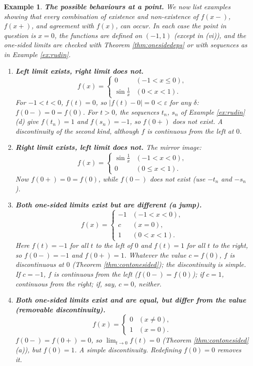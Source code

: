 \documentclass{article}
\theoremstyle{mythm}
\newtheorem{example}[theorem]{Example}
\begin{document}
\begin{example}\label{ex:possibilities}
\textbf{The possible behaviours at a point.} We now list examples showing that every combination of existence and non-existence of $f(x-)$, $f(x+)$, and agreement with $f(x)$, can occur. In each case the point in question is $x = 0$, the functions are defined on $(-1,1)$ (except in (vi)), and the one-sided limits are checked with Theorem \ref{thm:onesidedeps} or with sequences as in Example \ref{ex:rudin}.
\begin{enumerate}[label=(\roman*)]
    \item \textbf{Left limit exists, right limit does not.}
    \[
    f(x) = \begin{cases} 0 & (-1 < x \leq 0), \\ \sin \frac{1}{x} & (0 < x < 1). \end{cases}
    \]
    For $-1 < t < 0$, $f(t) = 0$, so $|f(t) - 0| = 0 < \varepsilon$ for any $\delta$: $f(0-) = 0 = f(0)$. For $t > 0$, the sequences $t_n$, $s_n$ of Example \ref{ex:rudin}(d) give $f(t_n) = 1$ and $f(s_n) = -1$, so $f(0+)$ does not exist. A discontinuity of the second kind, although $f$ is continuous from the left at $0$.

    \item \textbf{Right limit exists, left limit does not.} The mirror image:
    \[
    f(x) = \begin{cases} \sin \frac{1}{x} & (-1 < x < 0), \\ 0 & (0 \leq x < 1). \end{cases}
    \]
    Now $f(0+) = 0 = f(0)$, while $f(0-)$ does not exist (use $-t_n$ and $-s_n$).

    \item \textbf{Both one-sided limits exist but are different (a jump).}
    \[
    f(x) = \begin{cases} -1 & (-1 < x < 0), \\ c & (x = 0), \\ 1 & (0 < x < 1). \end{cases}
    \]
    Here $f(t) = -1$ for all $t$ to the left of $0$ and $f(t) = 1$ for all $t$ to the right, so $f(0-) = -1$ and $f(0+) = 1$. Whatever the value $c = f(0)$, $f$ is discontinuous at $0$ (Theorem \ref{thm:contonesided}); the discontinuity is simple. If $c = -1$, $f$ is continuous from the left ($f(0-) = f(0)$); if $c = 1$, continuous from the right; if, say, $c = 0$, neither.

    \item \textbf{Both one-sided limits exist and are equal, but differ from the value (removable discontinuity).}
    \[
    f(x) = \begin{cases} 0 & (x \neq 0), \\ 1 & (x = 0). \end{cases}
    \]
    $f(0-) = f(0+) = 0$, so $\lim_{t\to 0} f(t) = 0$ (Theorem \ref{thm:contonesided}(a)), but $f(0) = 1$. A simple discontinuity. Redefining $f(0) = 0$ removes it.


\end{enumerate}
\end{example}
\end{document}
